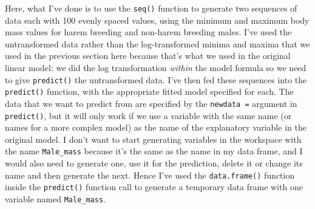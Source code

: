 \documentclass[
]{book}
\newenvironment{Shaded}{\begin{snugshade}}{\end{snugshade}}
\newcommand{\CommentTok}[1]{\textcolor[rgb]{0.56,0.35,0.01}{\textit{#1}}}
\newcommand{\DecValTok}[1]{\textcolor[rgb]{0.00,0.00,0.81}{#1}}
\newcommand{\FloatTok}[1]{\textcolor[rgb]{0.00,0.00,0.81}{#1}}
\newcommand{\KeywordTok}[1]{\textcolor[rgb]{0.13,0.29,0.53}{\textbf{#1}}}
\newcommand{\NormalTok}[1]{#1}
\newcommand{\OperatorTok}[1]{\textcolor[rgb]{0.81,0.36,0.00}{\textbf{#1}}}
\newcommand{\StringTok}[1]{\textcolor[rgb]{0.31,0.60,0.02}{#1}}
\begin{document}
\begin{Shaded}
\end{Shaded}

Here, what I've done is to use the \texttt{seq()} function to generate two sequences of data each with 100 evenly spaced values, using the minimum and maximum body mass values for harem breeding and non-harem breeding males. I've used the untransformed data rather than the log-transformed minima and maxima that we used in the previous section here because that's what we used in the original linear model: we did the log transformation \emph{within} the model formula so we need to give \texttt{predict()} the untransformed data. I've then fed these sequences into the \texttt{predict()} function, with the appropriate fitted model specified for each. The data that we want to predict from are specified by the \texttt{newdata\ =} argument in \texttt{predict()}, but it will only work if we use a variable with the same name (or names for a more complex model) as the name of the explanatory variable in the original model. I don't want to start generating variables in the workspace with the name \texttt{Male\_mass} because it's the same as the name in my data frame, and I would also need to generate one, use it for the prediction, delete it or change its name and then generate the next. Hence I've used the \texttt{data.frame()} function inside the \texttt{predict()} function call to generate a temporary data frame with one variable named \texttt{Male\_mass}.
\end{document}
